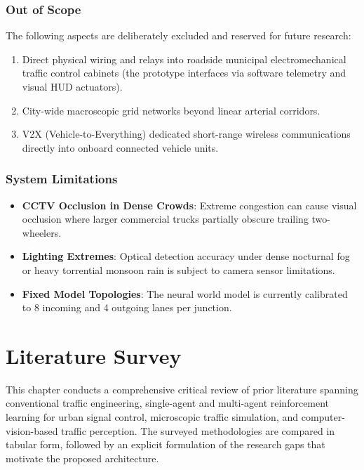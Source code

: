 \documentclass[12pt,a4paper,oneside]{report}
\begin{document}
\subsection{Out of Scope}
The following aspects are deliberately excluded and reserved for future research:
\begin{enumerate}
    \item Direct physical wiring and relays into roadside municipal electromechanical traffic control cabinets (the prototype interfaces via software telemetry and visual HUD actuators).
    \item City-wide macroscopic grid networks beyond linear arterial corridors.
    \item V2X (Vehicle-to-Everything) dedicated short-range wireless communications directly into onboard connected vehicle units.
\end{enumerate}

\subsection{System Limitations}
\begin{itemize}
    \item \textbf{CCTV Occlusion in Dense Crowds}: Extreme congestion can cause visual occlusion where larger commercial trucks partially obscure trailing two-wheelers.
    \item \textbf{Lighting Extremes}: Optical detection accuracy under dense nocturnal fog or heavy torrential monsoon rain is subject to camera sensor limitations.
    \item \textbf{Fixed Model Topologies}: The neural world model is currently calibrated to 8 incoming and 4 outgoing lanes per junction.
\end{itemize}

\chapter{Literature Survey}
\label{ch:lit_survey}

This chapter conducts a comprehensive critical review of prior literature spanning conventional traffic engineering, single-agent and multi-agent reinforcement learning for urban signal control, microscopic traffic simulation, and computer-vision-based traffic perception. The surveyed methodologies are compared in tabular form, followed by an explicit formulation of the research gaps that motivate the proposed architecture.
\end{document}
